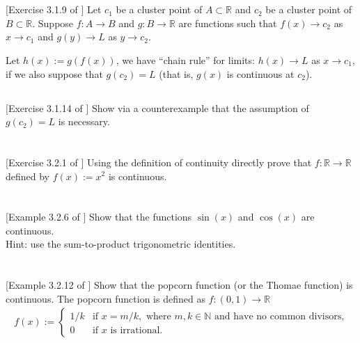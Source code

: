 \documentclass[11pt,letterpaper]{article}
\begin{document}
\section{} 
\subsection{}[Exercise 3.1.9 of \cite{Lebl_23}] 
Let $c_1$ be a cluster point of $A\subset\mathbb{R}$ and $c_2$ be a cluster point of $B\subset\mathbb{R}$. Suppose $f:A\to B$
and $g:B\to \mathbb{R}$ are functions such that $f(x)\to c_2$ as $x\to c_1$ and $g(y)\to L$ as $y\to c_2$. 

Let $h(x):= g(f(x))$, we have ``chain rule'' for limits: $h(x)\to L$ as $x\to c_1$, if we also suppose that $g(c_2)=L$ (that is, $g(x)$ is continuous at $c_2$).

\subsection{}[Exercise 3.1.14 of \cite{Lebl_23}] 
Show via a counterexample that the assumption of $g(c_2)=L$ is necessary.

\section{} [Exercise 3.2.1 of \cite{Lebl_23}] 
Using the definition of continuity directly prove that $f: \mathbb{R}\to \mathbb{R}$ defined by $f(x) := x^2$ is continuous.

\section{} [Example 3.2.6 of \cite{Lebl_23}] 
Show that the functions $\sin(x)$ and $\cos(x)$ are continuous. \\
Hint: use the sum-to-product trigonometric identities.

\section{} [Example 3.2.12 of \cite{Lebl_23}] 
Show that the popcorn function (or the Thomae function) is continuous. The popcorn function is defined as $f:(0,1)\to \mathbb{R}$
\begin{align}
    f(x) := \begin{cases}
        1/k & \text{if } x=m/k, \text{ where }m,k\in\mathbb{N}\text{ and have no common divisors,}\\
        0 & \text{if }x\text{ is irrational.}
    \end{cases}
\end{align}
\end{document}
